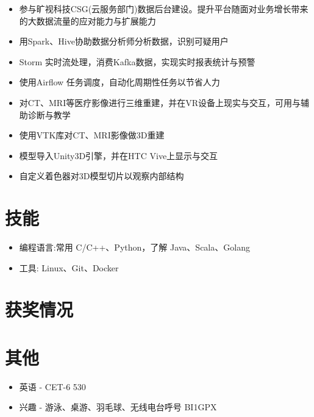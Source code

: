 \documentclass{resume}
\begin{document}
\begin{itemize}[topsep = 0 pt, partopsep = 0pt]
  \item 参与旷视科技CSG(云服务部门)数据后台建设。提升平台随面对业务增长带来的大数据流量的应对能力与扩展能力
  \item 用Spark、Hive协助数据分析师分析数据，识别可疑用户
  \item Storm 实时流处理，消费Kafka数据，实现实时报表统计与预警
  \item 使用Airflow 任务调度，自动化周期性任务以节省人力
\end{itemize}

\begin{itemize}[topsep = 0 pt, partopsep = 0pt]
  \item 对CT、MRI等医疗影像进行三维重建，并在VR设备上现实与交互，可用与辅助诊断与教学
  \item 使用VTK库对CT、MRI影像做3D重建
  \item 模型导入Unity3D引擎，并在HTC Vive上显示与交互
  \item 自定义着色器对3D模型切片以观察内部结构
\end{itemize}

\section{ 技能}
\begin{itemize}[parsep=0.5ex]
  \item 编程语言:常用 C/C++、Python，了解 Java、Scala、Golang
  \item 工具: Linux、Git、Docker
\end{itemize}

\section{ 获奖情况}

\section{ 其他}
\begin{itemize}[parsep=0.5ex]
  \item  英语 - CET-6 530
  \item  兴趣 - 游泳、桌游、羽毛球、无线电台呼号 BI1GPX
\end{itemize}
\end{document}

